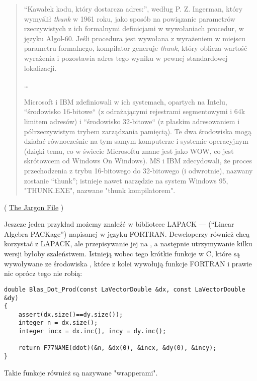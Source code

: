 \begin{framed}
\begin{quotation}
“Kawałek kodu, który dostarcza adres:”, według P. Z. Ingerman,
który wymyślił \emph{thunk} w 1961 roku, jako sposób na powiązanie parametrów rzeczywistych z ich formalnymi
definicjami w wywołaniach procedur, w języku Algol-60. Jeśli procedura jest wywołana z wyrażeniem
w miejscu parametru formalnego, kompilator generuje \emph{thunk}, który oblicza
wartość wyrażenia i pozostawia adres tego wyniku w pewnej standardowej lokalizacji.

\dots

Microsoft i IBM zdefiniowali w ich systemach, opartych na Intelu, “środowisko 16-bitowe“
(z odrażającymi rejestrami segmentowymi i 64k limitem adresów) i “środowisko 32-bitowe“
(z płaskim adresowaniem i półrzeczywistym trybem zarządzania pamięcią). Te dwa środowiska mogą
działać równocześnie na tym samym komputerze i systemie operacyjnym (dzięki temu, co w świecie Microsoftu znane jest jako WOW, co jest skrótowcem od Windows On Windows). MS i IBM zdecydowali, że proces przechodzenia
z trybu 16-bitowego do 32-bitowego (i odwrotnie), nazwany zostanie “thunk”; istnieje nawet
narzędzie na system Windows 95, "THUNK.EXE", nazwane "thunk kompilatorem".
\end{quotation}
\end{framed}
( \href{http://www.catb.org/jargon/html/T/thunk.html}{The Jargon File} )

Jeszcze jeden przykład możemy znaleźć w bibliotece LAPACK --- (``Linear Algebra PACKage'') napisanej w języku FORTRAN.
Deweloperzy \CCpp również chcą korzystać z LAPACK, ale przepisywanie jej na \CCpp, a następnie utrzymywanie kilku wersji byłoby szaleństwem.
Istnieją wobec tego krótkie funkcje w C, które są wywoływane ze środowiska \CCpp{}, które z kolei wywołują funkcje FORTRAN i prawie nic oprócz tego nie robią:

\begin{lstlisting}[style=customc]
double Blas_Dot_Prod(const LaVectorDouble &dx, const LaVectorDouble &dy)
{
    assert(dx.size()==dy.size());
    integer n = dx.size();
    integer incx = dx.inc(), incy = dy.inc();

    return F77NAME(ddot)(&n, &dx(0), &incx, &dy(0), &incy);
}
\end{lstlisting}

Takie funkcje również są nazywane "wrapperami".


